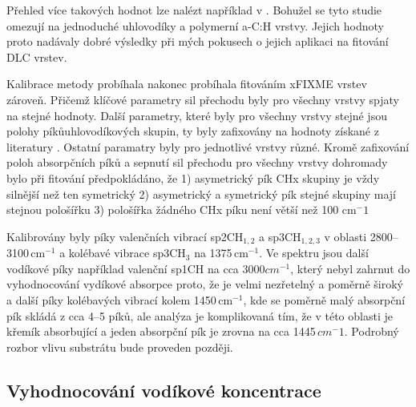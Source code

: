 Přehled více takových hodnot lze nalézt například v \cite{heitz1998}. Bohužel se tyto studie omezují na jednoduché uhlovodíky a polymerní a-C:H vrstvy. Jejich hodnoty proto nadávaly dobré výsledky při mých pokusech o jejich aplikaci na fitování DLC vrstev. 

Kalibrace metody probíhala nakonec probíhala fitováním xFIXME vrstev zároveň. Přičemž klíčové parametry sil přechodu byly pro všechny vrstvy spjaty na stejné hodnoty. Další parametry, které byly pro všechny vrstvy stejné jsou polohy píkůuhlovodíkových skupin, ty byly zafixovány na hodnoty získané z literatury \cite{Robertson2002, Dischler1983, Ristein1998, Zajickova2011}. Ostatní paramatry byly pro jednotlivé vrstvy různé.
Kromě zafixování poloh absorpčních píků a sepnutí sil přechodu pro všechny vrstvy dohromady bylo při fitování předpokládáno, že 
1) asymetrický pík CHx skupiny je vždy silnější než ten symetrický
2) asymetrický a symetrický pík stejné skupiny mají stejnou pološířku
3) pološířka žádného CHx píku není větší než 100 cm$^-1$

Kalibrovány byly píky valenčních vibrací sp2CH$_{1,2}$ a sp3CH$_{1,2,3}$ v oblasti 2800--3100\,cm$^{-1}$ a kolébavé vibrace sp3CH$_3$ na 1375\,cm$^{-1}$. Ve spektru jsou další vodíkové píky například valenční sp1CH na cca 3000$cm^{-1}$, který nebyl zahrnut do vyhodnocování vydíkové absorpce proto, že je velmi nezřetelný a poměrně široký a další píky kolébavých vibrací kolem 1450\,cm$^{-1}$, kde se poměrně malý absorpční pík skládá z cca 4--5 píků, ale analýza je komplikovaná tím, že v této oblasti je křemík absorbující a jeden absorpční pík je zrovna na cca 1445\,$cm^-1$. Podrobný rozbor vlivu substrátu bude proveden později.

\subsection{Vyhodnocování vodíkové koncentrace}

\cleardoublepage
